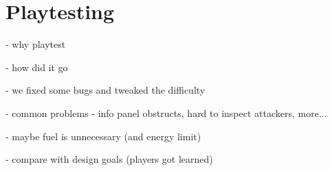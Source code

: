 \chapter{Playtesting}

- why playtest

- how did it go

- we fixed some bugs and tweaked the difficulty

- common problems - info panel obstructs, hard to inspect attackers, more...

- maybe fuel is unnecessary (and energy limit)

- compare with design goals (players got learned)
